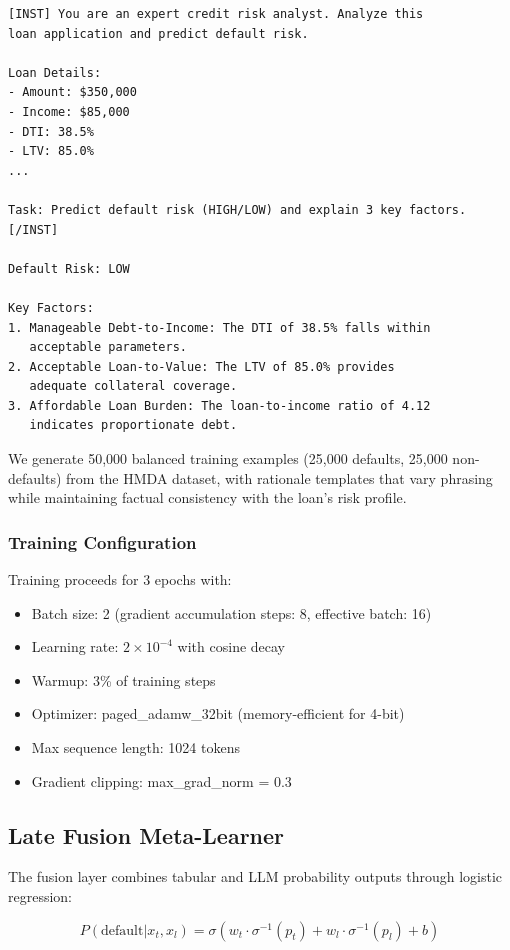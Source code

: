 \documentclass[11pt,a4paper]{article}
\begin{document}
\begin{lstlisting}[language={},caption={Instruction Template}]
[INST] You are an expert credit risk analyst. Analyze this 
loan application and predict default risk.

Loan Details:
- Amount: $350,000
- Income: $85,000
- DTI: 38.5%
- LTV: 85.0%
...

Task: Predict default risk (HIGH/LOW) and explain 3 key factors.[/INST]

Default Risk: LOW

Key Factors:
1. Manageable Debt-to-Income: The DTI of 38.5% falls within 
   acceptable parameters.
2. Acceptable Loan-to-Value: The LTV of 85.0% provides 
   adequate collateral coverage.
3. Affordable Loan Burden: The loan-to-income ratio of 4.12 
   indicates proportionate debt.
\end{lstlisting}

We generate 50,000 balanced training examples (25,000 defaults, 25,000 non-defaults) from the HMDA dataset, with rationale templates that vary phrasing while maintaining factual consistency with the loan's risk profile.

\subsubsection{Training Configuration}

Training proceeds for 3 epochs with:
\begin{itemize}
    \item Batch size: 2 (gradient accumulation steps: 8, effective batch: 16)
    \item Learning rate: $2 \times 10^{-4}$ with cosine decay
    \item Warmup: 3\% of training steps
    \item Optimizer: paged\_adamw\_32bit (memory-efficient for 4-bit)
    \item Max sequence length: 1024 tokens
    \item Gradient clipping: max\_grad\_norm = 0.3
\end{itemize}

\subsection{Late Fusion Meta-Learner}

The fusion layer combines tabular and LLM probability outputs through logistic regression:

\begin{equation}
P(\text{default}|x_t, x_l) = \sigma\left(w_t \cdot \sigma^{-1}(p_t) + w_l \cdot \sigma^{-1}(p_l) + b\right)
\end{equation}
\end{document}
